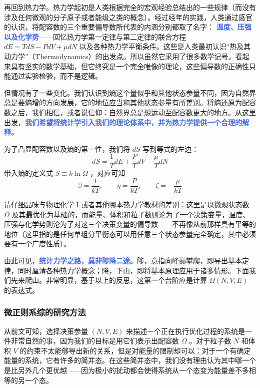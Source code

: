\documentclass[hyperref,UTF-8]{ctexart}
\newcommand{\0}{\boldsymbol{0}}
\begin{document}
再回到热力学。热力学起初是人类根据完全的宏观经验总结出的一些规律（而没有涉及任何微观的分子原子或者能级之类的概念）。经过经年的实践，人类通过感官的认识，将配容数的三个重要偏导数所代表的内涵分别都取了名字： \textcolor{RoyalBlue}{\textbf{\kaishu 温度、压强以及化学势}}——回忆热力学第一定律与第二定律的联合方程 $dE = TdS - PdV+ \mu dN$ 以及各种热力学平衡条件。这些是人类最初认识“热及其动力学”（Thermodynamics）的出发点。所以虽然它采用了很多数学记号，看起来具有坚实的数学基础，但它终究是一个完全唯像的理论，这些偏导数的正确性只能通过实验检验，而不是逻辑。

但情况有了一些变化。我们认识到熵这个量似乎和其他状态参量不同，因为自然界总是要熵增的方向发展，它的地位应当和其他状态参量有所差别。将熵还原为配容数之后，我们相信，或者说信仰：自然界总是想运动至配容数更大的地方。从这里出发，\textcolor{RoyalBlue}{\textbf{\kaishu 我们希望将统计学引入我们的理论体系中，并为热力学提供一个合理的解释。}} 

为了凸显配容数以及熵的第一性，我们将 $dS$ 写到等式的左边：
\begin{equation}
    dS = \frac{1}{T} dE + \frac{P}{T} dV - \frac{\mu}{T} dN
\end{equation}
带入熵的定义式 $S \equiv k\ln \Omega$ ，对应可知
\begin{equation}
    \beta = \frac{1}{kT} ,\quad\quad \eta = \frac{P}{kT} ,\quad\quad \zeta = -\frac{\mu}{kT} 
\end{equation}

请仔细品味与物理化学 I 或者其他哪本热力学教材的差别：这里是以微观状态数 $\Omega$ 及其最优化为基础的，而能量、体积和粒子数则沦为了一个决策变量，温度、压强与化学势则沦为了对这三个决策变量的偏导数——不再像从前那样具有平等的地位（这里指的是任何单组分平衡态可以用任意三个状态参量完全确定，其中必须要有一个广度性质）。

由此可见，\textcolor{RoyalBlue}{\textbf{\kaishu 统计力学之路，莫非陟降二途。}}陟，意指向峰巅攀爬，即导出基本定律，同时厘清各种热力学概念；降，下山，即将基本原理应用于诸多情形。下面我们先来爬山。非常明显，基于以上的反思，这第一个台阶应是计算 $\Omega (N,V,E)$ 的表达式。 


\subsubsection{微正则系综的研究方法}

从前文可知，选择决策参量 $(N,V,E)$ 来描述一个正在执行优化过程的系统是一件非常自然的事，因为我们的目标是用它们表示出配容数 $\Omega$ 。对于粒子数 $N$ 和体积 $V$ 的约束不太能够导出新的关系，但是对能量的限制却可以：对于一个有确定能量的系统，它有许多的简并态。在这些简并态中，我们没有理由认为其中哪一个是比另外几个更优越——因为极小的扰动都会使得系统从一个态变为能量差不多相等的另一个态。
\end{document}
